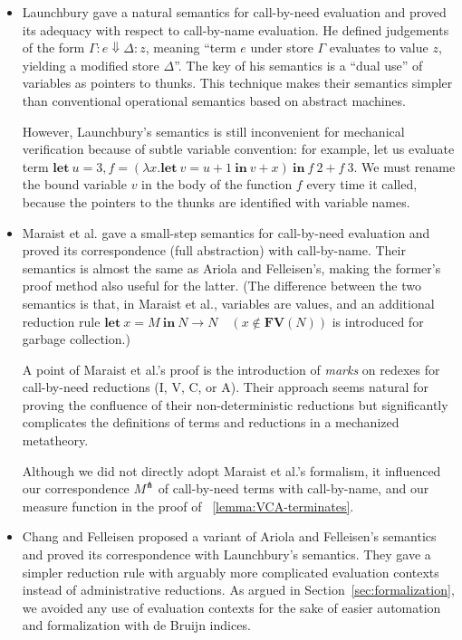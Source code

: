 \documentclass{llncs}
\newcommand{\LET}[3]{\mathbf{let}~#1=#2~\mathbf{in}~#3}
\newcommand{\EXPANDLET}[1]{#1^\pitchfork}
\begin{document}
\begin{itemize}
\item
Launchbury \cite{Launchbury93} gave a natural semantics for call-by-need evaluation and proved its adequacy with respect to call-by-name evaluation.
He defined judgements of the form $\Gamma : e \Downarrow \Delta : z$, meaning ``term $e$ under store $\Gamma$ evaluates to value $z$, yielding a modified store $\Delta$''.
%
The key of his semantics is a ``dual use'' of variables as pointers to thunks.
This technique makes their semantics simpler than conventional operational semantics based on abstract machines.

\qquad However, Launchbury's semantics is still inconvenient for mechanical verification because of subtle variable convention:
for example, let us evaluate term $\mathbf{let}~u=3, f = (\lambda x.\LET{v}{u+1}{v+x})~\mathbf{in}~f~2+f~3$.
%
We must rename the bound variable $v$ in the body of the function $f$ every time it called,
because the pointers to the thunks are identified with variable names.
\medskip
\item
Maraist et al. \cite{Maraist98} gave a small-step semantics for call-by-need evaluation and proved its correspondence (full abstraction) with call-by-name.
Their semantics is almost the same as Ariola and Felleisen's,
making the former's proof method also useful for the latter.
(The difference between the two semantics is that, in Maraist et al., variables are values, and an additional reduction rule
$\LET{x}{M}{N} \rightarrow N \quad (x \notin \mathbf{FV}(N))$
is introduced for garbage collection.)

\qquad A point of Maraist et al.'s proof is the introduction of \emph{marks} on redexes for call-by-need reductions (I, V, C, or A).
Their approach seems natural for proving the confluence of their non-deterministic reductions but significantly complicates the definitions of terms and reductions in a mechanized metatheory.

\qquad Although we did not directly adopt Maraist et al.'s formalism,
it influenced our correspondence $\EXPANDLET{M}$ of call-by-need terms with call-by-name, and our measure function in the proof of \lemmaname~\ref{lemma:VCA-terminates}.
\medskip
\item
Chang and Felleisen \cite{Chang12} proposed a variant of Ariola and Felleisen's semantics and proved its correspondence with Launchbury's semantics.
They gave a simpler reduction rule with arguably more complicated evaluation contexts instead of administrative reductions.
As argued in Section~\ref{sec:formalization},
we avoided any use of evaluation contexts for the sake of easier automation and formalization with de Bruijn indices.
\end{itemize}
\end{document}
